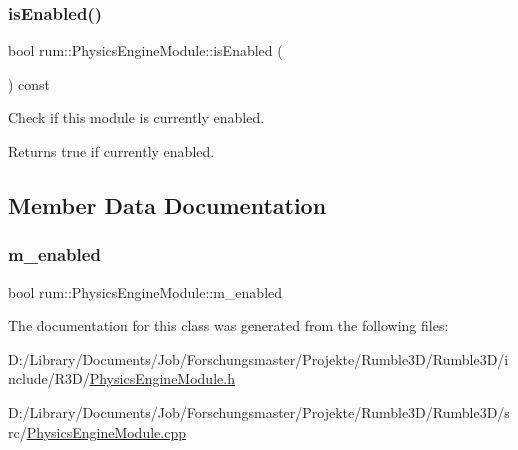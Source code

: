 \mbox{\label{classrum_1_1_physics_engine_module_a7cc5a831a9579d185daf3e981b9cf5ae}} 
\subsubsection{\texorpdfstring{is\+Enabled()}{isEnabled()}}
{\footnotesize\ttfamily bool rum\+::\+Physics\+Engine\+Module\+::is\+Enabled (\begin{DoxyParamCaption}{ }\end{DoxyParamCaption}) const}

Check if this module is currently enabled. \begin{DoxyReturn}{Returns}
true if currently enabled. 
\end{DoxyReturn}


\subsection{Member Data Documentation}
\mbox{\label{classrum_1_1_physics_engine_module_acf8ef2890d8aed6c265d28e4e0288e88}} 
\subsubsection{\texorpdfstring{m\+\_\+enabled}{m\_enabled}}
{\footnotesize\ttfamily bool rum\+::\+Physics\+Engine\+Module\+::m\+\_\+enabled\hspace{0.3cm}{\ttfamily [protected]}}



The documentation for this class was generated from the following files\+:\begin{DoxyCompactItemize}
\item 
D\+:/\+Library/\+Documents/\+Job/\+Forschungsmaster/\+Projekte/\+Rumble3\+D/\+Rumble3\+D/include/\+R3\+D/\mbox{\hyperlink{_physics_engine_module_8h}{Physics\+Engine\+Module.\+h}}\item 
D\+:/\+Library/\+Documents/\+Job/\+Forschungsmaster/\+Projekte/\+Rumble3\+D/\+Rumble3\+D/src/\mbox{\hyperlink{_physics_engine_module_8cpp}{Physics\+Engine\+Module.\+cpp}}\end{DoxyCompactItemize}

